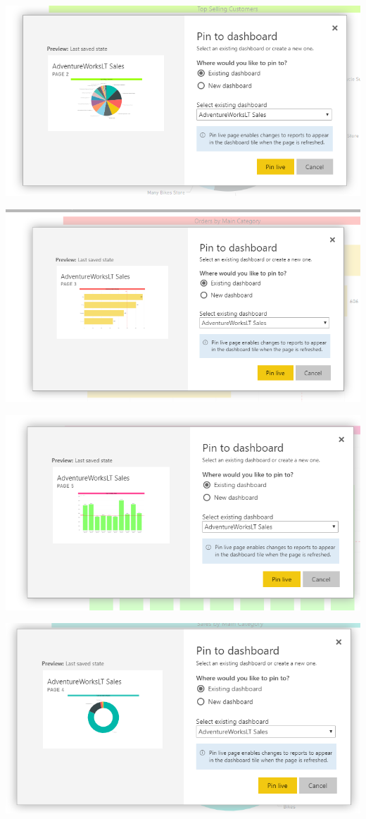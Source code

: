 	\begin{center}
	\includegraphics[width=18cm]{./Imagenes/EJER3T2(3)}
	\end{center}	

	\begin{center}
	\includegraphics[width=18cm]{./Imagenes/EJER3T2(4)}
	\end{center}	

	\begin{center}
	\includegraphics[width=18cm]{./Imagenes/EJER3T2(5)}
	\end{center}	

	\begin{center}
	\includegraphics[width=18cm]{./Imagenes/EJER3T2(6)}
	\end{center}	
